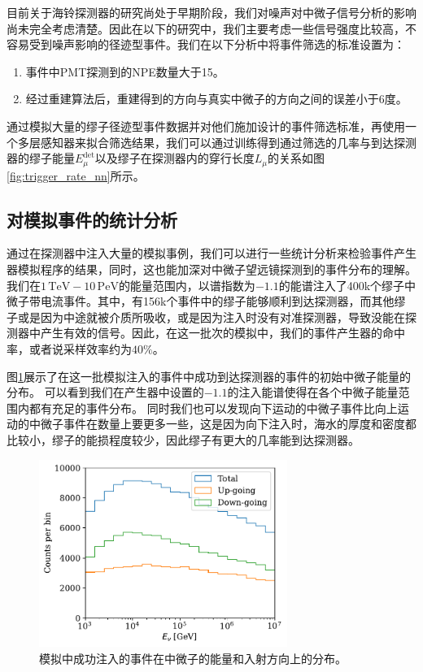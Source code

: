 目前关于海铃探测器的研究尚处于早期阶段，我们对噪声对中微子信号分析的影响尚未完全考虑清楚。因此在以下的研究中，我们主要考虑一些信号强度比较高，不容易受到噪声影响的径迹型事件。我们在以下分析中将事件筛选的标准设置为：
\begin{enumerate}
    \item 事件中PMT探测到的NPE数量大于15。
    \item 经过重建算法后，重建得到的方向与真实中微子的方向之间的误差小于6度。
\end{enumerate}

通过模拟大量的缪子径迹型事件数据并对他们施加设计的事件筛选标准，再使用一个多层感知器来拟合筛选结果，我们可以通过训练得到通过筛选的几率与到达探测器的缪子能量$E_\mu^\mathrm{det}$以及缪子在探测器内的穿行长度$L_\mu$的关系如图\ref{fig:trigger_rate_nn}所示。


\subsection{对模拟事件的统计分析}

通过在探测器中注入大量的模拟事例，我们可以进行一些统计分析来检验事件产生器模拟程序的结果，同时，这也能加深对中微子望远镜探测到的事件分布的理解。
我们在$1\,\mathrm{TeV} - 10\,\mathrm{PeV}$的能量范围内，以谱指数为$-1.1$的能谱注入了400k个缪子中微子带电流事件。其中，有156k个事件中的缪子能够顺利到达探测器，而其他缪子或是因为中途就被介质所吸收，或是因为注入时没有对准探测器，导致没能在探测器中产生有效的信号。因此，在这一批次的模拟中，我们的事件产生器的命中率，或者说采样效率约为$40\%$。

图\ref{fig:sampling_energy_spectrum_unweighted}展示了在这一批模拟注入的事件中成功到达探测器的事件的初始中微子能量的分布。
可以看到我们在产生器中设置的$-1.1$的注入能谱使得在各个中微子能量范围内都有充足的事件分布。
同时我们也可以发现向下运动的中微子事件比向上运动的中微子事件在数量上要更多一些，这是因为向下注入时，海水的厚度和密度都比较小，缪子的能损程度较少，因此缪子有更大的几率能到达探测器。

\begin{figure}[!ht]%
    \centering
    \includegraphics[width=0.72\textwidth]{img/sampling_energy_spectrum_unweighted.pdf}
    \caption{模拟中成功注入的事件在中微子的能量和入射方向上的分布。}
    \label{fig:sampling_energy_spectrum_unweighted}
\end{figure}

